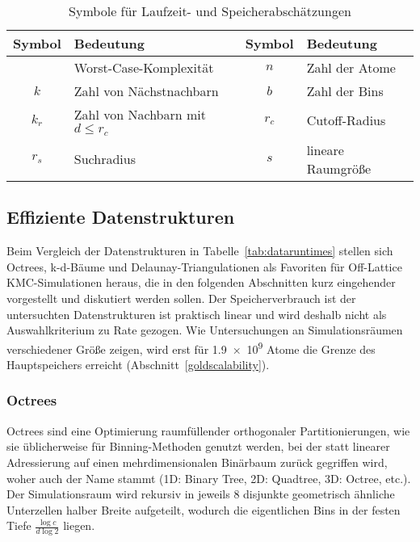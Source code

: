 \begin{table}[h]
  \vspace{1em}

  \oddrowcolors
  \caption{Symbole für Laufzeit- und Speicherabschätzungen}
  \label{tab:datasymbols}
  \begin{tabularx}{\textwidth}{|cX|cX|}
    \hline
    \textbf{Symbol} & \textbf{Bedeutung}                 & \textbf{Symbol} & \textbf{Bedeutung} \\
    \hline
    \BigO{}         & Worst-Case-Komplexität             & $n$             & Zahl der Atome     \\
    $k$             & Zahl von Nächstnachbarn            & $b$             & Zahl der Bins      \\
    $k_r$           & Zahl von Nachbarn mit $d \leq r_c$ & $r_c$           & Cutoff-Radius      \\
    $r_s$           & Suchradius                         & $s$             & lineare Raumgröße  \\
    \hline
  \end{tabularx}

\end{table}

\clearpage
\subsection{Effiziente Datenstrukturen}

Beim Vergleich der Datenstrukturen in Tabelle~\ref{tab:dataruntimes} stellen sich Octrees, k-d-Bäume und Delaunay-Triangulationen als Favoriten für Off-Lattice KMC-Simulationen heraus, die in den folgenden Abschnitten kurz eingehender vorgestellt und diskutiert werden sollen.
Der Speicherverbrauch ist der untersuchten Datenstrukturen ist praktisch linear und wird deshalb nicht als Auswahlkriterium zu Rate gezogen.
Wie Untersuchungen an Simulationsräumen verschiedener Größe zeigen, wird erst für \num{1.9e9} Atome die Grenze des Hauptspeichers erreicht (Abschnitt~\ref{goldscalability}).

\subsubsection{Octrees}
\label{dataoctree}

Octrees sind eine Optimierung raumfüllender orthogonaler Partitionierungen, wie sie üblicherweise für Binning-Methoden genutzt werden, bei der statt linearer Adressierung auf einen mehrdimensionalen Binärbaum zurück gegriffen wird, woher auch der Name stammt (1D: Binary Tree, 2D: Quadtree, 3D: Octree, etc.).
Der Simulationsraum wird rekursiv in jeweils 8 disjunkte geometrisch ähnliche Unterzellen halber Breite aufgeteilt, wodurch die eigentlichen Bins in der festen Tiefe $\frac{\log{c}}{d\log{2}}$ liegen.

